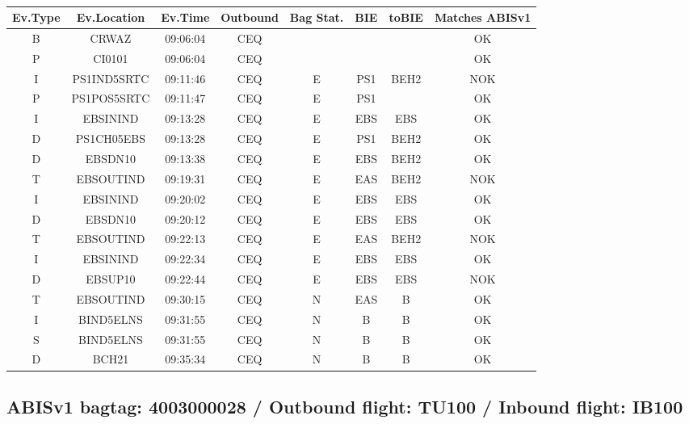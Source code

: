 \documentclass{report}
\begin{document}
\paragraph{}
\begin{longtable}{cccccccc}    \toprule
\rowcolor{white!50}
\textbf{Ev.Type} & \textbf{Ev.Location} & \textbf{Ev.Time} & \textbf{Outbound} & \textbf{Bag Stat.} & \textbf{BIE} & \textbf{toBIE} & \textbf{Matches ABISv1} \\\midrule
B & CRWAZ & 09:06:04  & CEQ &  &  &  & OK\\
P & CI0101 & 09:06:04  & CEQ &  &  &  & OK\\
I & PS1IND5SRTC & 09:11:46  & CEQ & E & PS1 & BEH2 & NOK\\
P & PS1POS5SRTC & 09:11:47  & CEQ & E & PS1 &  & OK\\
I & EBSININD & 09:13:28  & CEQ & E & EBS & EBS & OK\\
D & PS1CH05EBS & 09:13:28  & CEQ & E & PS1 & BEH2 & OK\\
D & EBSDN10 & 09:13:38  & CEQ & E & EBS & BEH2 & OK\\
T & EBSOUTIND & 09:19:31  & CEQ & E & EAS & BEH2 & NOK\\
I & EBSININD & 09:20:02  & CEQ & E & EBS & EBS & OK\\
D & EBSDN10 & 09:20:12  & CEQ & E & EBS & EBS & OK\\
T & EBSOUTIND & 09:22:13  & CEQ & E & EAS & BEH2 & NOK\\
I & EBSININD & 09:22:34  & CEQ & E & EBS & EBS & OK\\
D & EBSUP10 & 09:22:44  & CEQ & E & EBS & EBS & NOK\\
T & EBSOUTIND & 09:30:15  & CEQ & N & EAS & B & OK\\
I & BIND5ELNS & 09:31:55  & CEQ & N & B & B & OK\\
S & BIND5ELNS & 09:31:55  & CEQ & N & B & B & OK\\
D & BCH21 & 09:35:34  & CEQ & N & B & B & OK\\
\bottomrule
\end{longtable}
\subsection*{ABISv1 bagtag: 4003000028 / Outbound flight: TU100 / Inbound flight: IB100}
\end{document}
